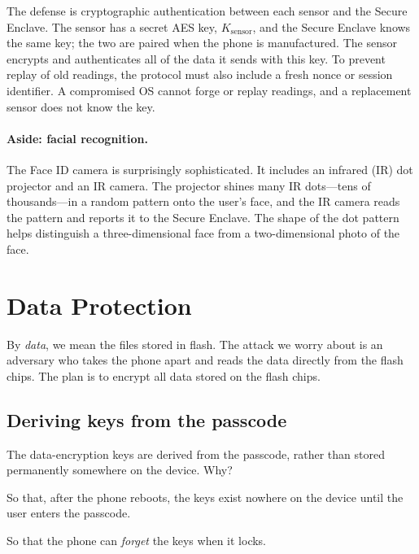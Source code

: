 The defense is cryptographic authentication between each sensor and the
Secure Enclave.
The sensor has a secret AES key, $K_\text{sensor}$, and the Secure Enclave
knows the same key; the two are paired when the phone is manufactured.
The sensor encrypts and authenticates all of the data it sends with this
key.
To prevent replay of old readings, the protocol must also include a fresh
nonce or session identifier.
A compromised OS cannot forge or replay readings, and a replacement
sensor does not know the key.

\paragraph{Aside: facial recognition.}
The Face ID camera is surprisingly sophisticated.
It includes an infrared (IR) dot projector and an IR camera.
The projector shines many IR dots---tens of thousands---in a random
pattern onto the user's face, and the IR camera reads the pattern and
reports it to the Secure Enclave.
The shape of the dot pattern helps distinguish a three-dimensional face
from a two-dimensional photo of the face.

\section{Data Protection}
\label{sec:ios:dp}

By \emph{data}, we mean the files stored in flash.
The attack we worry about is an adversary who takes the phone apart and
reads the data directly from the flash chips.
The plan is to encrypt all data stored on the flash chips.

\subsection{Deriving keys from the passcode}

The data-encryption keys are derived from the passcode, rather than
stored permanently somewhere on the device.
Why?
\begin{compactitem}
  \item So that, after the phone reboots, the keys exist nowhere on the
        device until the user enters the passcode.
  \item So that the phone can \emph{forget} the keys when it locks.
\end{compactitem}


